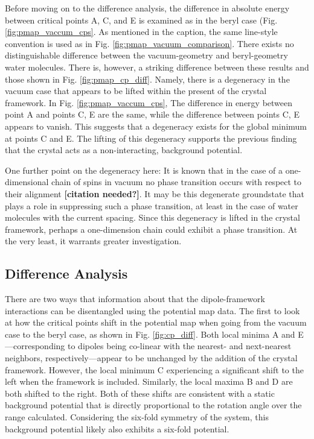        Before moving on to the difference analysis, the difference in absolute energy between critical points A, C, and E is examined as in the beryl case (Fig. \ref{fig:pmap_vaccum_cps}. As mentioned in the caption, the same line-style convention is used as in Fig. \ref{fig:pmap_vacuum_comparison}. There exists no distinguishable difference between the vacuum-geometry and beryl-geometry water molecules. There is, however, a striking difference between these results and those shown in Fig. \ref{fig:pmap_cp_diff}. Namely, there is a degeneracy in the vacuum case that appears to be lifted within the present of the crystal framework. In Fig. \ref{fig:pmap_vaccum_cps}, The difference in energy between point A and points C, E are the same, while the difference between points C, E appears to vanish. This suggests that a degeneracy exists for the global minimum at points C and E. The lifting of this degeneracy supports the previous finding that the crystal acts as a non-interacting, background potential.
        
        One further point on the degeneracy here: It is known that in the case of a one-dimensional chain of spins in vacuum no phase transition occurs with respect to their alignment \textbf{[citation needed?]}. It may be this degenerate groundstate that plays a role in suppressing such a phase transition, at least in the case of water molecules with the current spacing. Since this degeneracy is lifted in the crystal framework, perhaps a one-dimension chain could exhibit a phase transition. At the very least, it warrants greater investigation.
        
        \subsection{Difference Analysis}
        \label{sec:diff_anal}
        
        There are two ways that information about that the dipole-framework interactions can be disentangled using the potential map data. The first to look at how the critical points shift in the potential map when going from the vacuum case to the beryl case, as shown in Fig. \ref{fig:cp_diff}. Both local minima A and E---corresponding to dipoles being co-linear with the nearest- and next-nearest neighbors, respectively---appear to be unchanged by the addition of the crystal framework. However, the local minimum C experiencing a significant shift to the left when the framework is included. Similarly, the local maxima B and D are both shifted to the right. Both of these shifts are consistent with a static background potential that is directly proportional to the rotation angle over the range calculated. Considering the six-fold symmetry of the system, this background potential likely also exhibits a six-fold potential.
        
